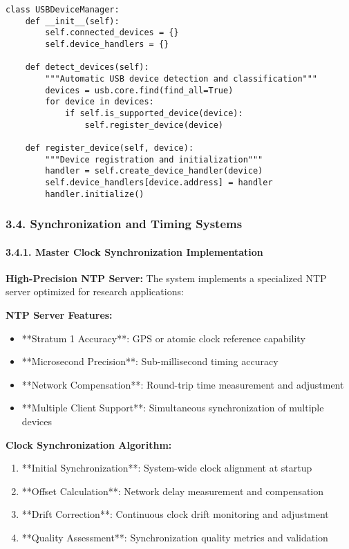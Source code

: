 \documentclass[12pt,a4paper]{article}
\begin{document}
\begin{verbatim}
class USBDeviceManager:
    def __init__(self):
        self.connected_devices = {}
        self.device_handlers = {}
    
    def detect_devices(self):
        """Automatic USB device detection and classification"""
        devices = usb.core.find(find_all=True)
        for device in devices:
            if self.is_supported_device(device):
                self.register_device(device)
    
    def register_device(self, device):
        """Device registration and initialization"""
        handler = self.create_device_handler(device)
        self.device_handlers[device.address] = handler
        handler.initialize()
\end{verbatim}

\subsubsection{3.4. Synchronization and Timing Systems}

\paragraph{3.4.1. Master Clock Synchronization Implementation}

\textbf{High-Precision NTP Server:}
The system implements a specialized NTP server optimized for research applications:

\textbf{NTP Server Features:}

\begin{itemize}
\item **Stratum 1 Accuracy**: GPS or atomic clock reference capability
\item **Microsecond Precision**: Sub-millisecond timing accuracy
\item **Network Compensation**: Round-trip time measurement and adjustment
\item **Multiple Client Support**: Simultaneous synchronization of multiple devices

\end{itemize}
\textbf{Clock Synchronization Algorithm:}

\begin{enumerate}
\item **Initial Synchronization**: System-wide clock alignment at startup
\item **Offset Calculation**: Network delay measurement and compensation
\item **Drift Correction**: Continuous clock drift monitoring and adjustment
\item **Quality Assessment**: Synchronization quality metrics and validation

\end{enumerate}
\end{document}
